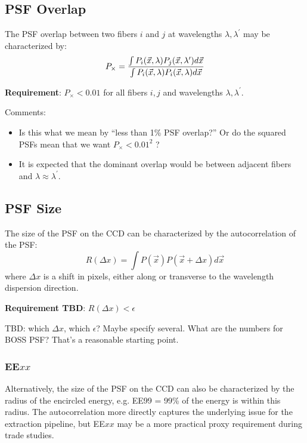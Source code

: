 \documentclass[12pt]{article}
\begin{document}
\subsection{PSF Overlap}

The PSF overlap between two fibers $i$ and $j$ at wavelengths
$\lambda, \lambda^\prime$ may be characterized by:
\begin{equation}
    P_\times =
        { \int P_i(\vec x, \lambda) P_j(\vec x, \lambda^\prime) d \vec x \over
          \int P_i(\vec x, \lambda) P_i(\vec x, \lambda) d \vec x }
\end{equation}

{\bf Requirement}: $P_\times < 0.01$ for all fibers $i, j$ and
wavelengths $\lambda, \lambda^\prime$.

Comments:
\begin{itemize}
    \item Is this what we mean by ``less than 1\% PSF overlap?''  Or do
        the squared PSFs mean that we want $P_\times < 0.01^2$ ?
    \item It is expected that the dominant overlap would be between
        adjacent fibers and $\lambda \approx \lambda^\prime$.
\end{itemize}

\subsection{PSF Size}

The size of the PSF on the CCD can be characterized by the autocorrelation
of the PSF:
\begin{equation}
    R(\Delta x) =
        \int P(\vec x) P(\vec x + \Delta x) d \vec x
\end{equation}
where $\Delta x$ is a shift in pixels, either along or transverse to
the wavelength dispersion direction.

{\bf Requirement TBD}: $R(\Delta x) < \epsilon$

TBD: which $\Delta x$, which $\epsilon$?  Maybe specify several.
What are the numbers for BOSS PSF?  That's a reasonable starting point.

\subsubsection{EE$xx$}

Alternatively, the size of the PSF on the CCD can also be characterized
by the radius of the encircled energy, e.g. EE99 = 99\% of the energy is
within this radius.  The autocorrelation more directly captures the underlying
issue for the extraction pipeline, but EE$xx$ may be a more practical
proxy requirement during trade studies.
\end{document}
